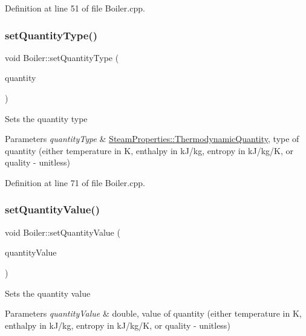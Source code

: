 Definition at line 51 of file Boiler.\+cpp.

\mbox{\label{class_boiler_a9c5b20cae6133c9174b12760f36d52c2}} 
\subsubsection{\texorpdfstring{set\+Quantity\+Type()}{setQuantityType()}}
{\footnotesize\ttfamily void Boiler\+::set\+Quantity\+Type (\begin{DoxyParamCaption}\item[{\hyperlink{class_steam_properties_ae0294bedf7d178c2d8fb6aed0f62fbff}{Steam\+Properties\+::\+Thermodynamic\+Quantity}}]{quantity }\end{DoxyParamCaption})}

Sets the quantity type 
\begin{DoxyParams}{Parameters}
{\em quantity\+Type} & \hyperlink{class_steam_properties_ae0294bedf7d178c2d8fb6aed0f62fbff}{Steam\+Properties\+::\+Thermodynamic\+Quantity}, type of quantity (either temperature in K, enthalpy in k\+J/kg, entropy in k\+J/kg/K, or quality -\/ unitless) \\
\hline
\end{DoxyParams}


Definition at line 71 of file Boiler.\+cpp.

\mbox{\label{class_boiler_ac3450d88dba124529d59baf62c39e14a}} 
\subsubsection{\texorpdfstring{set\+Quantity\+Value()}{setQuantityValue()}}
{\footnotesize\ttfamily void Boiler\+::set\+Quantity\+Value (\begin{DoxyParamCaption}\item[{double}]{quantity\+Value }\end{DoxyParamCaption})}

Sets the quantity value 
\begin{DoxyParams}{Parameters}
{\em quantity\+Value} & double, value of quantity (either temperature in K, enthalpy in k\+J/kg, entropy in k\+J/kg/K, or quality -\/ unitless) \\
\hline
\end{DoxyParams}


